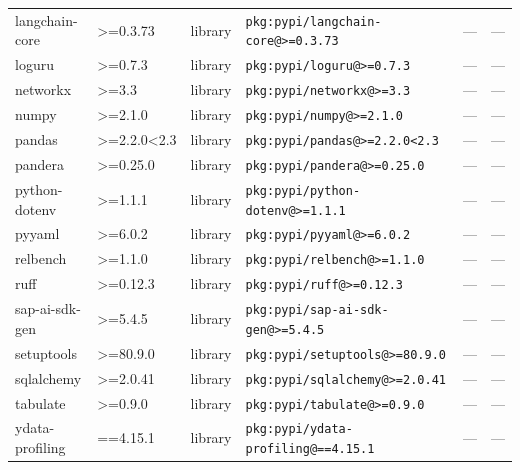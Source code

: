 \documentclass[11pt,a4paper]{article}
\begin{document}
\begin{longtable}{|p{4cm}|p{2cm}|p{1.6cm}|p{5cm}|p{1.5cm}|p{3.5cm}|}
\raggedright langchain-core & \textgreater{}=0.3.73 & library & \small\texttt{pkg:pypi/langchain-core@\textgreater{}=0.3.73} & — & \small — \\
\raggedright loguru & \textgreater{}=0.7.3 & library & \small\texttt{pkg:pypi/loguru@\textgreater{}=0.7.3} & — & \small — \\
\raggedright networkx & \textgreater{}=3.3 & library & \small\texttt{pkg:pypi/networkx@\textgreater{}=3.3} & — & \small — \\
\raggedright numpy & \textgreater{}=2.1.0 & library & \small\texttt{pkg:pypi/numpy@\textgreater{}=2.1.0} & — & \small — \\
\raggedright pandas & \textgreater{}=2.2.0\textless{}2.3 & library & \small\texttt{pkg:pypi/pandas@\textgreater{}=2.2.0\textless{}2.3} & — & \small — \\
\raggedright pandera & \textgreater{}=0.25.0 & library & \small\texttt{pkg:pypi/pandera@\textgreater{}=0.25.0} & — & \small — \\
\raggedright python-dotenv & \textgreater{}=1.1.1 & library & \small\texttt{pkg:pypi/python-dotenv@\textgreater{}=1.1.1} & — & \small — \\
\raggedright pyyaml & \textgreater{}=6.0.2 & library & \small\texttt{pkg:pypi/pyyaml@\textgreater{}=6.0.2} & — & \small — \\
\raggedright relbench & \textgreater{}=1.1.0 & library & \small\texttt{pkg:pypi/relbench@\textgreater{}=1.1.0} & — & \small — \\
\raggedright ruff & \textgreater{}=0.12.3 & library & \small\texttt{pkg:pypi/ruff@\textgreater{}=0.12.3} & — & \small — \\
\raggedright sap-ai-sdk-gen & \textgreater{}=5.4.5 & library & \small\texttt{pkg:pypi/sap-ai-sdk-gen@\textgreater{}=5.4.5} & — & \small — \\
\raggedright setuptools & \textgreater{}=80.9.0 & library & \small\texttt{pkg:pypi/setuptools@\textgreater{}=80.9.0} & — & \small — \\
\raggedright sqlalchemy & \textgreater{}=2.0.41 & library & \small\texttt{pkg:pypi/sqlalchemy@\textgreater{}=2.0.41} & — & \small — \\
\raggedright tabulate & \textgreater{}=0.9.0 & library & \small\texttt{pkg:pypi/tabulate@\textgreater{}=0.9.0} & — & \small — \\
\raggedright ydata-profiling & ==4.15.1 & library & \small\texttt{pkg:pypi/ydata-profiling@==4.15.1} & — & \small — \\
\end{longtable}
\end{document}
